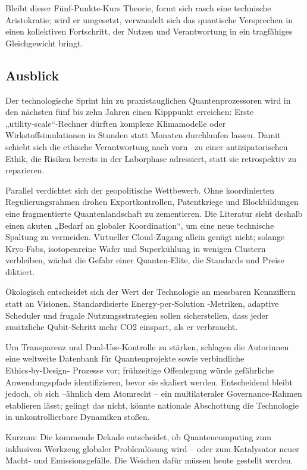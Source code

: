 Bleibt dieser Fünf‑Punkte‑Kurs Theorie, formt sich rasch eine technische Aristokratie; wird er umgesetzt, verwandelt sich das quantische Versprechen in einen kollektiven Fortschritt, der Nutzen und Verantwortung in ein tragfähiges Gleichgewicht bringt.



\subsection{Ausblick}


Der technologische Sprint hin zu praxistauglichen Quantenprozessoren wird in den nächsten fünf bis zehn Jahren einen Kipppunkt erreichen: Erste „utility‑scale“‑Rechner dürften komplexe Klimamodelle oder Wirkstoffsimulationen in Stunden statt Monaten durchlaufen lassen. Damit schiebt sich die ethische Verantwortung nach vorn –zu einer antizipatorischen Ethik, die Risiken bereits in der Laborphase adressiert, statt sie retrospektiv zu reparieren.

Parallel verdichtet sich der geopolitische Wettbewerb. Ohne koordinierten Regulierungsrahmen drohen Exportkontrollen, Patentkriege und Blockbildungen eine fragmentierte Quantenlandschaft zu zementieren. Die Literatur sieht deshalb einen akuten „Bedarf an globaler Koordination“, um eine neue technische Spaltung zu vermeiden. Virtueller Cloud‑Zugang allein genügt nicht; solange Kryo‑Fabs, isotopenreine Wafer und Superkühlung in wenigen Clustern verbleiben, wächst die Gefahr einer Quanten‑Elite, die Standards und Preise diktiert.

Ökologisch entscheidet sich der Wert der Technologie an messbaren Kennziffern statt an Visionen. Standardisierte Energy‑per‑Solution ‑Metriken, adaptive Scheduler und frugale Nutzungsstrategien sollen sicherstellen, dass jeder zusätzliche Qubit‑Schritt mehr CO2 einspart, als er verbraucht.

Um Transparenz und Dual‑Use‑Kontrolle zu stärken, schlagen die Autor\*innen eine weltweite Datenbank für Quantenprojekte sowie verbindliche Ethics‑by‑Design‑ Prozesse vor; frühzeitige Offenlegung würde gefährliche Anwendungspfade identifizieren, bevor sie skaliert werden. Entscheidend bleibt jedoch, ob sich –ähnlich dem Atomrecht – ein multilateraler Governance‑Rahmen etablieren lässt; gelingt das nicht, könnte nationale Abschottung die Technologie in unkontrollierbare Dynamiken stoßen.

Kurzum: Die kommende Dekade entscheidet, ob Quantencomputing zum inklusiven Werkzeug globaler Problemlösung wird – oder zum Katalysator neuer Macht‑ und Emissionsgefälle. Die Weichen dafür müssen heute gestellt werden.











